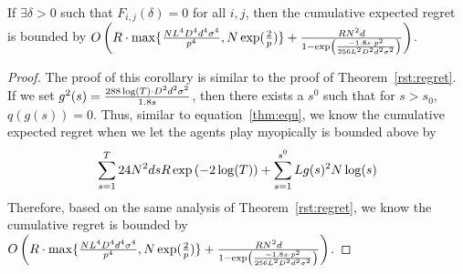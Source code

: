 
\begin{corollary} \label{cor:constant-regret}
If $\exists \delta>0$ such that $F_{i,j}(\delta)=0$ for all $i,j$, then the cumulative expected regret is bounded by $O \left(R\cdot \max\{\frac{N L^4 D^4 d^4 \sigma^4}{p^4}, N\exp(\frac{2}{p})\}
  + \frac{R N^2 d}{1 - \exp \left(
    \frac{-1.8 s \cdot p^2}{256 L^2 D^2 d^2 \sigma^2}
  \right)} \right) $.
\end{corollary}

\begin{proof}
The proof of this corollary is similar to the proof of Theorem~\ref{rst:regret}. If we set $g^2(s) = \frac{288\log(T) \cdot D^2 d^2 \sigma^2}{1.8 s}$, then there exists a $s^{0}$ such that for $s>s_{0}$, $q(g(s))=0$. Thus, similar to equation~\eqref{thm:equ}, we know the cumulative expected regret when we let the agents play myopically is bounded above by
\begin{align}
\sum_{s=1}^{T} 24N^2 d s R \exp\left(-2\log(T)\right)+ \sum_{s=1}^{s^{0}}L g(s)^2N\log(s) \nonumber
\end{align}
Therefore, based on the same analysis of Theorem~\ref{rst:regret}, we know the cumulative regret is bounded by $O \left(R\cdot \max\{\frac{N L^4 D^4 d^4 \sigma^4}{p^4}, N\exp(\frac{2}{p})\}
  + \frac{R N^2 d}{1 - \exp \left(
    \frac{-1.8 s \cdot p^2}{256 L^2 D^2 d^2 \sigma^2}
  \right)} \right) $.
\end{proof}

